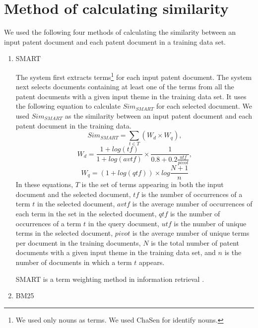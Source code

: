 \documentclass[english]{jnlp_1.2c}
\begin{document}
\section{Method of calculating similarity}
\label{sec:similarity}

We used the following four methods 
of calculating the similarity between an input patent document and 
each patent document in a training data set.
\begin{enumerate}
\item 
SMART

The system first extracts terms\footnote{We used only nouns as terms. We used ChaSen\cite{chasen} for identify nouns.} for each input patent document. 
The system next selects documents containing at least 
one of the terms from all the patent documents with a given input theme in the training data set. 
It uses the following equation to calculate $Sim_{SMART}$
for each selected document. 
We used $Sim_{SMART}$ as 
the similarity between an input patent document and 
each patent document in the training data.
\begin{equation}
Sim_{SMART} = \sum_{t \in T} (W_d \times W_q),
\end{equation}
\begin{equation}
W_d = \frac{1+log(tf)}{1+log(avtf)} \times \frac{1}{0.8 + 0.2 \frac{utf}{pivot}},
\end{equation}
\begin{equation}
W_q = (1 + log(qtf)) \times log \frac{N + 1}{n}
\end{equation}
In these equations, 
$T$ is the set of terms appearing in
both the input document and the selected document,
$tf$ is the number of occurrences of a term $t$ 
in the selected document,
$avtf$ is the average number of occurrences of each term in the set in the selected document,
$qtf$ is the number of occurrences of a term $t$ 
in the query document,
$utf$ is the number of unique terms in the selected document,
$pivot$ is the average number of unique terms per document in the training documents, 
$N$ is the total number of patent documents with a given input theme in the training data set,
and $n$ is the number of documents in which a term $t$ appears. 

SMART is a term weighting method in information retrieval \cite{Singhal96_2,smart97_2,Iwayama_2004}.

\item 
BM25


\end{enumerate}
\end{document}
